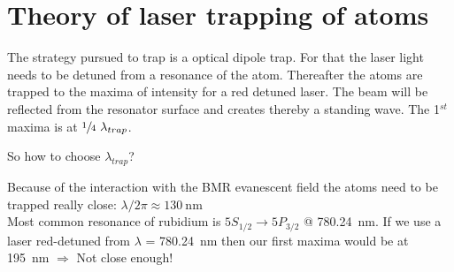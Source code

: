 
\chapter{Theory of laser trapping of atoms}

\ifpdf{}
    \graphicspath{{Chapter1/Figs/Raster/}{Chapter1/Figs/PDF/}{Chapter1/Figs/}}
\else
    \graphicspath{{Chapter1/Figs/Vector/}{Chapter1/Figs/}}
\fi

The strategy pursued to trap is a optical dipole trap. For that the laser light 
needs to be detuned from a resonance of the atom. Thereafter the atoms are trapped
to the maxima of intensity for a red detuned laser. The beam will be reflected 
from the resonator surface and creates thereby a standing wave. The 1\(^{st}\)
maxima is at \(\sfrac{1}{4}~\lambda_{trap} \).
\bigskip

So how to choose \(\lambda_{trap}\)?
\bigskip

Because of the interaction with the BMR evanescent field the atoms need to
be trapped really close: \(\lambda / 2\pi \approx \SI{130}{\nano\meter} \) \\
Most common resonance of rubidium is \(5S_{1/2} \rightarrow 5P_{3/2}\) @
\SI{780.24}{\nano\meter}. If we use a laser red-detuned from \(\lambda \) = 
\SI{780.24}{\nano\meter} then our first maxima would be at \SI{195}{\nano\meter}
\(\Rightarrow \) Not close enough!
\bigskip

